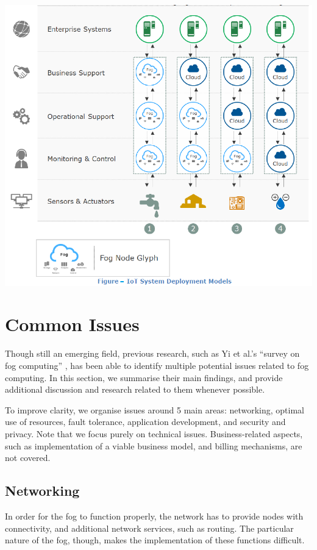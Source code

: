 \documentclass{article}
\begin{document}
\includegraphics[scale=0.7]{models.png}  


\pagebreak

\section{Common Issues}

Though still an emerging field, previous research, such as Yi et al.'s ``survey on fog computing'' \cite{yi2015survey}, has been able to identify multiple potential issues related to fog computing. In this section, we summarise their main findings, and provide additional discussion and research related to them whenever possible.

To improve clarity, we organise issues around 5 main areas: networking, optimal use of resources, fault tolerance, application development, and security and privacy. Note that we focus purely on technical issues. Business-related aspects, such as implementation of a viable business model, and billing mechanisms, are not covered.

\subsection{Networking}
In order for the fog to function properly, the network has to provide nodes with connectivity, and additional network services, such as routing. The particular nature of the fog, though, makes the implementation of these functions difficult. 
\end{document}
